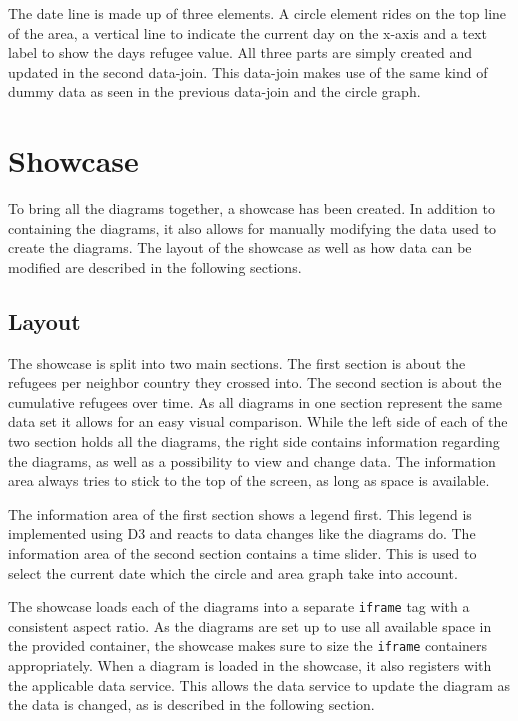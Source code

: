 The date line is made up of three elements. A circle element rides on the top line of the area, a vertical line to indicate the current day on the x-axis and a text label to show the days refugee value. All three parts are simply created and updated in the second data-join. This data-join makes use of the same kind of dummy data as seen in the previous data-join and the circle graph.


\section{Showcase} \label{sec:showcase}
To bring all the diagrams together, a showcase has been created. In addition to containing the diagrams, it also allows for manually modifying the data used to create the diagrams. The layout of the showcase as well as how data can be modified are described in the following sections.

\subsection{Layout}
The showcase is split into two main sections. The first section is about the refugees per neighbor country they crossed into. The second section is about the cumulative refugees over time. As all diagrams in one section represent the same data set it allows for an easy visual comparison. While the left side of each of the two section holds all the diagrams, the right side contains information regarding the diagrams, as well as a possibility to view and change data. The information area always tries to stick to the top of the screen, as long as space is available.

The information area of the first section shows a legend first. This legend is implemented using D3 and reacts to data changes like the diagrams do. The information area of the second section contains a time slider. This is used to select the current date which the circle and area graph take into account. 

The showcase loads each of the diagrams into a separate \texttt{iframe} tag with a consistent aspect ratio. As the diagrams are set up to use all available space in the provided container, the showcase makes sure to size the \texttt{iframe} containers appropriately. When a diagram is loaded in the showcase, it also registers with the applicable data service. This allows the data service to update the diagram as the data is changed, as is described in the following section.

